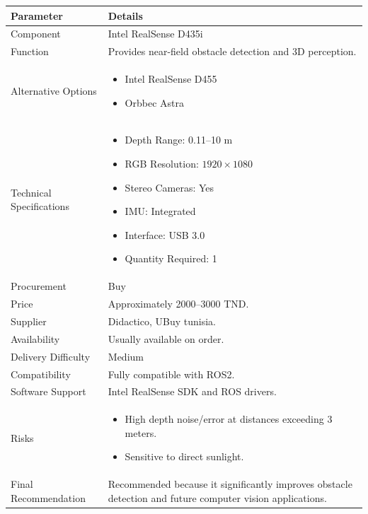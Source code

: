 \documentclass[12pt,a4paper]{article}
\begin{document}
\begin{longtable}{|p{4cm}|p{10cm}|}
\hline
\textbf{Parameter} & \textbf{Details} \\
\hline

Component &
Intel RealSense D435i \\
\hline

Function &
Provides near-field obstacle detection and 3D perception. \\
\hline

Alternative Options &
\begin{itemize}
\item Intel RealSense D455
\item Orbbec Astra
\end{itemize}
\\
\hline

Technical Specifications &
\begin{itemize}
\item Depth Range: 0.11--10 m
\item RGB Resolution: $1920 \times 1080$
\item Stereo Cameras: Yes
\item IMU: Integrated
\item Interface: USB 3.0
\item Quantity Required: 1
\end{itemize}
\\
\hline

Procurement &
Buy \\
\hline

Price &
Approximately 2000--3000 TND. \\
\hline

Supplier &
Didactico, UBuy tunisia. \\
\hline

Availability &
Usually available on order. \\
\hline

Delivery Difficulty &
Medium \\
\hline

Compatibility &
Fully compatible with ROS2. \\
\hline

Software Support &
Intel RealSense SDK and ROS drivers. \\
\hline

Risks &
\begin{itemize}
\item High depth noise/error at distances exceeding 3 meters.
\item Sensitive to direct sunlight.
\end{itemize}
\\
\hline

Final Recommendation &
Recommended because it significantly improves obstacle detection and future computer vision applications. \\
\hline

\end{longtable}
\end{document}
